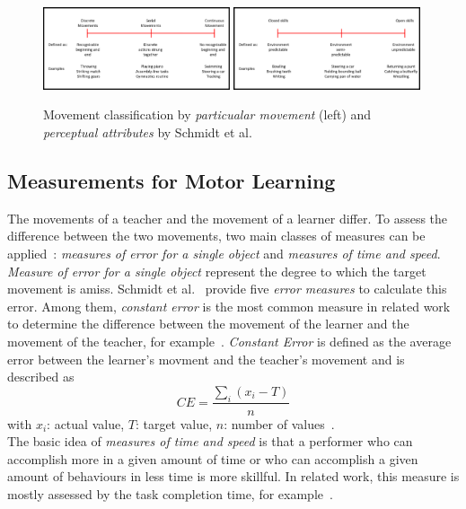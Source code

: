 \begin{figure}[htb]
	\centering
	\includegraphics[width=0.49\textwidth]{figures/movement_classification.png}
	\includegraphics[width=0.49\textwidth]{figures/movement_classification2.png}
	\caption[Movement classifications by Scmhidt et al.]{Movement classification by \textit{particualar movement} (left) and \textit{perceptual attributes} by Schmidt et al.~\cite{mlbook}}
	\label{fig:movement_classification}
\end{figure}

\subsection{Measurements for Motor Learning}
\label{section:measures_for_ml}
The movements of a teacher and the movement of a learner differ. To assess the difference between the two movements, two main classes of measures can be applied~\cite{mlbook}: \textit{measures of error for a single object} and \textit{measures of time and speed}.
\textit{Measure of error for a single object} represent the degree to which the target movement is amiss. Schmidt et al.~\cite{mlbook} provide five \textit{error measures} to calculate this error. Among them, \textit{constant error} is the most common measure in related work to determine the difference between the movement of the learner and the movement of the teacher, for example~\cite{perspectivematters,thaichichua,YouMove,onebody,vrdancetrainer,lightguide,physioathome}. \textit{Constant Error} is defined as the average error between the learner's movment and the teacher's movement and is described as
\begin{equation}
	\label{eq:constanterror}
	CE=\frac{\sum_i(x_i-T)}{n}
\end{equation}
with $x_i$: actual value, $T$: target value, $n$: number of values~\cite{mlbook}.\\
The basic idea of \textit{measures of time and speed} is that a performer who can accomplish more in a given amount of time or who can accomplish a given amount of behaviours in less time is more skillful. In related work, this measure is mostly assessed by the task completion time, for example~\cite{perspectivematters,onebody,lightguide}.


